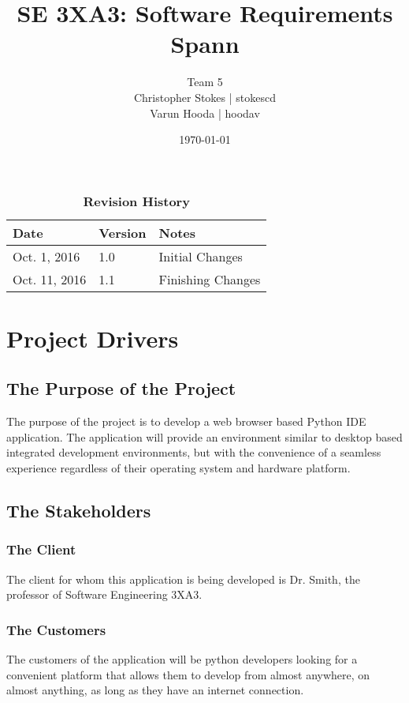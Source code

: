 \documentclass[12pt, titlepage]{article}
\title{SE 3XA3: Software Requirements\\Spann}
\author{Team 5
		\\ Christopher Stokes | stokescd
		\\ Varun Hooda | hoodav
}
\date{\today}
\begin{document}
\maketitle

\tableofcontents
\listoftables
\listoffigures

\begin{table}[bp]
\caption{\bf Revision History}
\begin{tabularx}{\textwidth}{p{3cm}p{2cm}X}
\toprule {\bf Date} & {\bf Version} & {\bf Notes}\\
\midrule
Oct. 1, 2016 & 1.0 & Initial Changes\\
Oct. 11, 2016 & 1.1 & Finishing Changes\\
\bottomrule
\end{tabularx}
\end{table}

\newpage


\section{Project Drivers}

  \subsection{The Purpose of the Project}
  The purpose of the project is to develop a web browser based Python IDE
  application. The application will provide an environment similar to desktop
  based integrated development environments, but with the convenience of a
	seamless experience regardless of their operating system and hardware
	platform.

  \subsection{The Stakeholders}

    \subsubsection{The Client}
    The client for whom this application is being developed is Dr. Smith, the
    professor of Software Engineering 3XA3.

    \subsubsection{The Customers}
    The customers of the application will be python developers looking for a
    convenient platform that allows them to develop from almost anywhere, on
    almost anything, as long as they have an internet connection.
\end{document}
